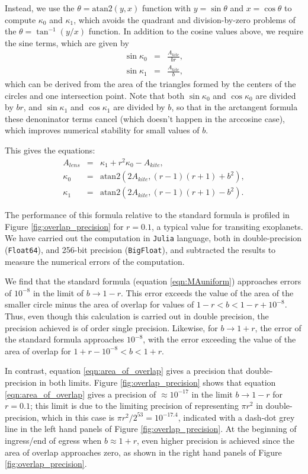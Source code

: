 \documentclass[modern]{aastex61}
\begin{document}
Instead, we use the $\theta = \mathrm{atan2}(y,x)$ function with $y=\sin{\theta}$ and
$x=\cos{\theta}$ to compute $\kappa_0$ and $\kappa_1$, which avoids the quadrant and
division-by-zero problems of the $\theta = \tan^{-1}(y/x)$ function.  In addition
to the cosine values above, we require the sine terms, which are given by
\begin{eqnarray}
\sin{\kappa_0} &=& \frac{A_{kite}}{br},\\
\sin{\kappa_1} &=& \frac{A_{kite}}{b},
\end{eqnarray}
which can be derived from the area of the triangles formed by the centers of
the circles and one intersection point.
Note that both $\sin{\kappa_0}$ and $\cos{\kappa_0}$ are divided by $br$, and
$\sin{\kappa_1}$ and $\cos{\kappa_1}$ are divided by $b$, so that
in the arctangent formula these denoninator terms cancel (which doesn't happen
in the arccosine case), which improves numerical stability for small values of $b$.

This gives the equations:
\begin{eqnarray} \label{eqn:area_of_overlap}
A_{lens} &=& \kappa_1 + r^2\kappa_0 - A_{kite},\\
\kappa_0 &=& \mathrm{atan2}(2A_{kite},(r-1)(r+1)+b^2),\\
\kappa_1 &=& \mathrm{atan2}(2A_{kite},(r-1)(r+1)-b^2).
\end{eqnarray}

The performance of this formula relative to the standard formula is profiled
in Figure \ref{fig:overlap_precision} for $r=0.1$, a typical
value for transiting exoplanets.  We have carried out
the computation in \texttt{Julia} language, both in double-precision
(\texttt{Float64}), and 256-bit precision (\texttt{BigFloat}), and
subtracted the results to measure the numerical errors of the computation.

We find that the standard
formula (equation \ref{eqn:MAuniform}) approaches errors of $10^{-8}$
in the limit of $b \rightarrow 1-r$. This error exceeds the value
of the area of the smaller circle minus the area of overlap for
values of $1-r < b < 1-r+10^{-8}$.  Thus, even though this calculation
is carried out in double precision, the precision achieved is of
order single precision.  Likewise, for $b \rightarrow 1+r$,
the error of the standard formula approaches $10^{-8}$, with the
error exceeding the value of the area of overlap for $1+r-10^{-8} <
b < 1+r$.

In contrast, equation \ref{eqn:area_of_overlap} gives a precision
that double-precision in both limits.  Figure
\ref{fig:overlap_precision} shows that equation \ref{eqn:area_of_overlap} 
gives a precision of $\approx 10^{-17}$ in the limit $b \rightarrow
1-r$ for $r=0.1$; this limit is due to the limiting precision of
representing $\pi r^2$ in double-precision, which in this case
is $\pi r^2 / 2^{53} = 10^{-17.4}$, indicated with a dash-dot
grey line in the left hand panels of Figure \ref{fig:overlap_precision}.
At the beginning of ingress/end of egress when $b \approx 1+r$, 
even higher precision is achieved since the area of overlap approaches
zero, as shown in the right hand panels of Figure \ref{fig:overlap_precision}.
\end{document}
